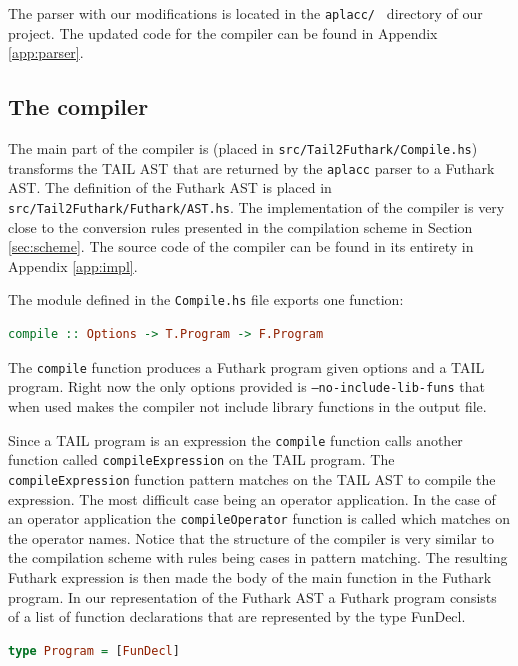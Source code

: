 \documentclass[11pt]{article}
\begin{document}
The parser with our modifications is located in the {\tt aplacc/ } directory of our project. 
The updated code for the compiler can be found in Appendix \ref{app:parser}.

\subsection{The compiler}
The main part of the compiler is (placed in {\tt src/Tail2Futhark/Compile.hs}) transforms the TAIL AST that are returned by the {\tt aplacc} parser to a Futhark AST. The definition of the Futhark AST is placed in {\tt src/Tail2Futhark/Futhark/AST.hs}.
The implementation of the compiler is very close to the conversion rules presented in the compilation scheme in Section \ref{sec:scheme}. The source code of the compiler can be found in its entirety in Appendix \ref{app:impl}.

The module defined in the {\tt Compile.hs} file exports one function:
\begin{lstlisting}[language=haskell]
compile :: Options -> T.Program -> F.Program
\end{lstlisting}

The {\tt compile} function produces a Futhark program given options and a TAIL program. 
Right now the only options provided is {\tt --no-include-lib-funs} that when used makes the compiler not include library functions in the output file. 

Since a TAIL program is an expression the {\tt compile} function calls another function called {\tt compileExpression} on the TAIL program. The {\tt compileExpression} function pattern matches on the TAIL AST to compile the expression. The most difficult case being an operator application. In the case of an operator application the {\tt compileOperator} function is called which matches on the operator names. Notice that the structure of the compiler is very similar to the compilation scheme with rules being cases in pattern matching.
The resulting Futhark expression is then made the body of the main
function in the Futhark program. 
In our representation of the Futhark AST a Futhark program consists of a list of function declarations that are represented by the type FunDecl. 

\begin{lstlisting}[language=haskell]
type Program = [FunDecl]
\end{lstlisting}
\end{document}
